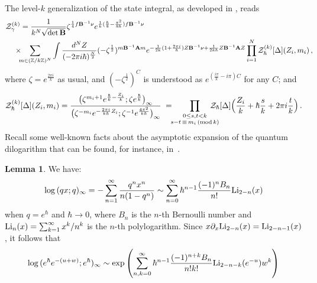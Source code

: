 \documentclass[12pt]{amsart}
\theoremstyle{definition}
\newtheorem{lemma}[theorem]{Lemma}
\def\BZ{\mathbb Z}
\def\be{  \begin{equation} }
\def\ee{  \end{equation} }
\newcommand{\CZ}{\mathcal{Z}}
\newcommand{\mb}{\mathbf}
\begin{document}
The level-$k$ generalization of the state integral, as developed in 
\cite{D-levelk}, reads
%
\begin{align} 
\CZ_\gamma^{(k)}&= \frac{1}{k^N\sqrt{\det\mb B}}\zeta^{\frac14f\mb B^{-1}\nu}
  e^{\frac1k(\frac\hbar8-\frac{\pi^2}{8\hbar})f\mb B^{-1}\nu}  \notag\\
  &\hspace{-.3cm}\times \hspace{-.2cm} \sum_{m\in(\BZ/k\BZ)^N} 
\int \frac{d^NZ}{(-2\pi i \hbar)^{\frac N2}}
(-\zeta^{\frac12})^{m\mb B^{-1}\mb A m} 
e^{-\frac1{2k}(1+\frac{2\pi i}{\hbar})Z\mb B^{-1}\nu+\frac1{2k\hbar}Z\mb B^{-1}\mb AZ} 
\prod_{i=1}^N \CZ_\hbar^{(k)}[\Delta](Z_i,m_i)
\,,\hspace{-.5cm}\label{SSk}
\end{align}
%
where $\zeta=e^{\frac{2\pi i}{k}}$ as usual, and $(-\zeta^{\frac12})^C$ is 
understood as $e^{(\frac{i\pi}{k}-i\pi)C}$ for any $C$; and
%
\be 
\CZ_\hbar^{(k)}[\Delta](Z_i,m_i)  = 
\frac{\big(\zeta^{m_i+1}e^{\frac\hbar k-\frac {Z_i}k};\zeta 
e^{\frac\hbar k}\big)_\infty}
{\big(\zeta^{-m_i}e^{-\frac{2\pi i}{k\hbar}{Z_i}};\zeta^{-1}
e^{\frac{4\pi^2}{k\hbar}}\big)_\infty}
\; =\hspace{-.2cm}
 \prod_{\mbox{$0\leq s,t< k \atop  s-t\,\equiv\, m_i\,(\text{mod}\,k)$}} 
\hspace{-.5cm}\CZ_\hbar[\Delta]\Big(\frac {Z_i}k+ \hbar\frac s k 
+2\pi i \frac tk\Big)\,.   
\ee
%
Recall some well-known facts about the asymptotic expansion of the
quantum dilogarithm that can be found, for instance, 
in~\cite[Sec. II.D]{Za:dilogarithm}.

\begin{lemma}
\label{lem.AQDL}
We have:
$$
\log \, (q x;q)_\infty = -\sum_{n=1}^\infty \frac{q^n x^n}{n(1-q^n)} \sim
\sum_{n=0}^\infty \hbar^{n-1} \frac{(-1)^n B_n}{n!} {\rm Li}_{2-n}(x)
$$
when $q=e^\hbar$ and $\hbar \rightarrow 0$,
where $B_n$ is the $n$-th Bernoulli number and ${\rm Li}_n(x)=\sum_{k=1}^\infty
x^k/n^k$ is the $n$-th polylogarithm. Since 
$x \partial_x {\rm Li}_{2-n}(x)={\rm Li}_{2-n-1}(x)$, it follows that 
$$
\log \, (e^\hbar e^{-(u + w)}; e^\hbar)_\infty \sim 
\exp\left( \sum_{n,k=0}^\infty \hbar^{n-1} 
\frac{(-1)^{n+k} B_n}{n!k!} {\rm Li}_{2-n-k}(e^{-u})w^k
\right)
$$
\end{lemma}
\end{document}
